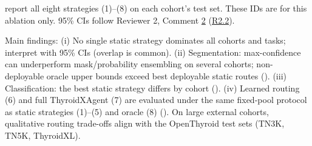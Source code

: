 \begin{authorresponse}
 report all eight strategies (1)--(8) on each cohort's test set. These IDs are for this ablation only. 95\% CIs follow Reviewer 2, Comment \hyperref[rev:R2.2]{2} (\hyperref[rev:R2.2]{R2.2}).\par
Main findings: (i) No single static strategy dominates all cohorts and tasks; interpret with 95\% CIs (overlap is common). (ii) Segmentation: max-confidence can underperform mask/probability ensembling on several cohorts; non-deployable oracle upper bounds exceed best deployable static routes (). (iii) Classification: the best static strategy differs by cohort (). (iv) Learned routing (6) and full ThyroidXAgent (7) are evaluated under the same fixed-pool protocol as static strategies (1)--(5) and oracle (8) (). On large external cohorts, qualitative routing trade-offs align with the OpenThyroid test sets (TN3K, TN5K, ThyroidXL).\par
\par
\end{authorresponse}





